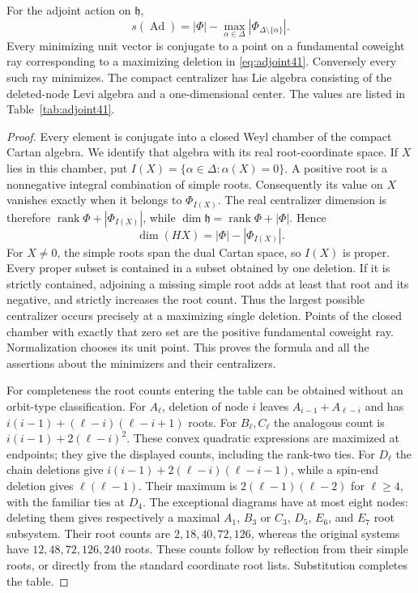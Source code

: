 \begin{theorem}\label{thm:adjoint41}
For the adjoint action on $\mathfrak h$,
\begin{equation}\label{eq:adjoint41}
 s(\operatorname{Ad})=|\Phi|-
       \max_{\alpha\in\Delta}|\Phi_{\Delta\setminus\{\alpha\}}|.
\end{equation}
Every minimizing unit vector is conjugate to a point on a fundamental
coweight ray corresponding to a maximizing deletion in
\eqref{eq:adjoint41}. Conversely every such ray minimizes. The compact
centralizer has Lie algebra consisting of the deleted-node Levi algebra
and a one-dimensional center. The values are listed in
Table~\ref{tab:adjoint41}.
\end{theorem}
\begin{proof}
Every element is conjugate into a closed Weyl chamber of the compact
Cartan algebra. We identify that algebra with its real root-coordinate
space. If $X$ lies in this chamber, put
$I(X)=\{\alpha\in\Delta:\alpha(X)=0\}$. A positive root is a
nonnegative integral combination of simple roots. Consequently its
value on $X$ vanishes exactly when it belongs to $\Phi_{I(X)}$.
The real centralizer dimension is therefore
$\operatorname{rank}\Phi+|\Phi_{I(X)}|$, while
$\dim\mathfrak h=\operatorname{rank}\Phi+|\Phi|$. Hence
\[
 \dim(HX)=|\Phi|-|\Phi_{I(X)}|.
\]
For $X\ne0$, the simple roots span the dual Cartan space, so $I(X)$
is proper. Every proper subset is contained in a subset obtained by
one deletion. If it is strictly contained, adjoining a missing simple
root adds at least that root and its negative, and strictly increases
the root count. Thus the largest possible centralizer occurs precisely
at a maximizing single deletion. Points of the closed chamber with
exactly that zero set are the positive fundamental coweight ray.
Normalization chooses its unit point. This proves the formula and all
the assertions about the minimizers and their centralizers.

For completeness the root counts entering the table can be obtained
without an orbit-type classification. For $A_\ell$, deletion of node
$i$ leaves $A_{i-1}+A_{\ell-i}$ and has
$i(i-1)+(\ell-i)(\ell-i+1)$ roots. For $B_\ell,C_\ell$ the analogous
count is $i(i-1)+2(\ell-i)^2$. These convex quadratic expressions are
maximized at endpoints; they give the displayed counts, including the
rank-two ties. For $D_\ell$ the chain deletions give
$i(i-1)+2(\ell-i)(\ell-i-1)$, while a spin-end deletion gives
$\ell(\ell-1)$. Their maximum is $2(\ell-1)(\ell-2)$ for
$\ell\ge4$, with the familiar ties at $D_4$.
The exceptional diagrams have at most eight nodes: deleting them gives
respectively a maximal $A_1$, $B_3$ or $C_3$, $D_5$, $E_6$, and $E_7$
root subsystem. Their root counts are $2,18,40,72,126$, whereas the
original systems have $12,48,72,126,240$ roots. These counts follow by
reflection from their simple roots, or directly from the standard
coordinate root lists. Substitution completes the table.
\end{proof}

